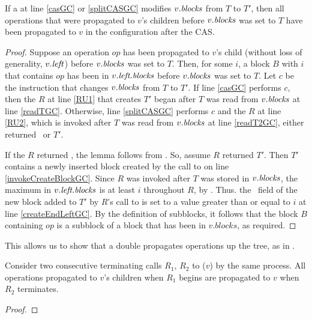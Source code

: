 \begin{lemma}\label{successfulRefreshGC}
If a  at line \ref{casGC} or \ref{splitCASGC} modifies $v.\mbox{\textit{blocks}}$ from $T$ to $T'$,
then all operations that were propagated to $v$'s children before $v.\mbox{\textit{blocks}}$ was set to $T$
have been propagated to $v$ in the configuration after the CAS.
\end{lemma}
\begin{proof}
Suppose an operation $op$ has been propagated to $v$'s child (without loss of generality, $v.\mbox{\textit{left}}$) before $v.\mbox{\textit{blocks}}$ was set to $T$.
Then, for some $i$, a block $B$ with  $i$ that contains $op$
has been in $v.\mbox{\textit{left.blocks}}$ before $v.\mbox{\textit{blocks}}$ was set to $T$.
Let $c$ be the  instruction that changes $v.\mbox{\textit{blocks}}$ from $T$ to $T'$.
If line \ref{casGC} performs $c$, then the  $R$ at line \ref{RU1} that creates
$T'$ began after $T$ was read from $v.\mbox{\textit{blocks}}$ at line \ref{readTGC}.
Otherwise, line \ref{splitCASGC} performs $c$ and the  $R$ at line \ref{RU2},
which is invoked after $T$ was read from $v.\mbox{\textit{blocks}}$ at line \ref{readT2GC},
either returned \nl\ or $T'$.

If the  $R$ returned \nl, the lemma follows from .
So, assume  $R$ returned $T'$.
Then $T'$ contains a newly inserted block created by the call
to  on line \ref{invokeCreateBlockGC}.
Since $R$ was invoked after $T$ was stored in $v.\mbox{\textit{blocks}}$, 
the maximum  in $v.\mbox{\textit{left.blocks}}$ is at least $i$ throughout $R$, by .
Thus. the \eleft\ field of the new block added to $T'$ by $R$'s call to  is
set to a value greater than or equal to $i$ at line \ref{createEndLeftGC}.
By the definition of subblocks, it follows that the block $B$ containing $op$ is a subblock of a block
that has been in $v.blocks$, as required.
\end{proof}

This allows us to show that a double  propagates operations up the tree, 
as in .

\begin{lemma}\label{lem::doubleRefreshGC}
Consider two consecutive terminating calls $R_1$, $R_2$ to ($v$) by the same process.
All operations propagated to $v$'s children when $R_1$ begins
are propagated to $v$ when $R_2$ terminates.
\end{lemma}
\begin{proof}
\end{proof}






